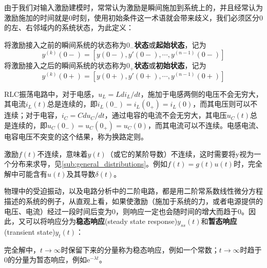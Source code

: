 由于我们对输入激励建模时，常常认为激励是瞬间施加到系统上的，并且经常认为激励施加的时间就是0时刻，使用初始条件这一术语就会带来歧义，我们必须区分0的左、右邻域内的系统状态，为此定义\cite{signal_systems}：
\begin{definition}[起始状态和初始状态]
    将激励接入之前的瞬间系统的状态称为\textbf{$0_-$状态}或\textbf{起始状态}，记为
    \[y^{(k)}(0-)=[y(0-),y'(0-),\cdots,y^{(n-1)}(0-)]\]
    将激励接入之后的瞬间系统的状态称为\textbf{$0_+$状态}或\textbf{初始状态}，记为
    \[y^{(k)}(0+)=[y(0+),y'(0+),\cdots,y^{(n-1)}(0+)]\]
\end{definition}

\begin{example}[换路定则]
    RLC振荡电路中，对于电感，$u_L=Ldi_L/dt$，施加于电感两侧的电压不会无穷大，其电流$i_L(t)$总是连续的，即$i_L(0_-)=i_L(0_+)=i_L(0)$，而其电压则可以不连续；对于电容，$i_C=Cdu_C/dt$，通过电容的电流不会无穷大，其电压$u_C(t)$总是连续的，即$u_C(0_-)=u_C(0_+)=u_C(0)$，而其电流可以不连续。电感电流、电容电压不突变的这个结果，称为换路定则。
\end{example}

激励$f(t)$不连续，意味着$y(t)$（或它的某阶导数）不连续，这时需要将y视为一个分布来求导，见\ref{sub:general_distributions}。例如$f(t)=g(t)u(t)$时，完全解中可能含有$u(t)$及其导数$\delta(t)$。

物理中的受迫振动，以及电路分析中的二阶电路，都是用二阶常系数线性微分方程描述的系统的例子，从直观上看，如果使激励（施加于系统的力，或者电源提供的电压、电流）经过一段时间后变为0，则响应一定也会随时间的增大而趋于0。因此，又可以将响应分为\textbf{稳态响应}(steady state response)$y_{ss}(t)$和\textbf{暂态响应}(transient state)$y_t(t)$：
\begin{definition}[稳态响应和暂态响应]
完全解中，$t\to\infty$时保留下来的分量称为稳态响应，例如一个常数；$t\to\infty$时趋于0的分量为暂态响应，例如$\mathrm{e}^{-\lambda t}$。
\end{definition}

